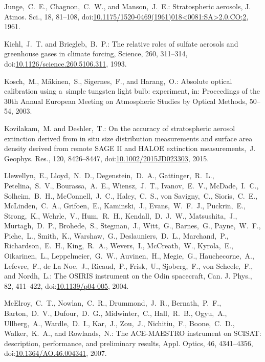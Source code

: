 \documentclass[amtd, online, hvmath]{copernicus}
\begin{document}
\begin{thebibliography}{99}
Junge,~C.~E., Chagnon,~C.~W., and Manson,~J.~E.: Stratospheric aerosols, J.
Atmos. Sci., 18, 81--108,
doi:\href{http://dx.doi.org/10.1175/1520-0469(1961)018<0081:SA>2.0.CO;2}{10.1175/1520-0469(1961)018\textless0081:SA\textgreater2.0.CO;2},
1961.


Kiehl,~J.~T. and Briegleb,~B.~P.: The relative roles of sulfate aerosols and
greenhouse gases in climate forcing, Science, 260, 311--314,
doi:\href{http://dx.doi.org/10.1126/science.260.5106.311}{10.1126/science.260.5106.311},
1993.


Kosch,~M., M\"{a}kinen,~S., Sigernes,~F., and Harang,~O.: Absolute optical
calibration using a~simple tungsten light bulb: experiment, in: Proceedings
of the 30th Annual European Meeting on Atmospheric Studies by Optical
Methods, 50--54, 2003.


Kovilakam,~M. and Deshler,~T.: On the accuracy of stratospheric aerosol
extinction derived from in situ size distribution measurements and surface
area density derived from remote SAGE II and HALOE extinction
measurements,~J. Geophys. Res., 120, 8426--8447,
doi:\href{http://dx.doi.org/10.1002/2015JD023303}{10.1002/2015JD023303},
2015.


Llewellyn,~E., Lloyd,~N.~D., Degenstein,~D.~A., Gattinger,~R.~L.,
Petelina,~S.~V., Bourassa,~A.~E., Wiensz,~J.~T., Ivanov,~E.~V.,
McDade,~I.~C., Solheim,~B.~H., McConnell,~J.~C., Haley,~C.~S., von
Savigny,~C., Sioris,~C.~E., McLinden,~C.~A., Grifoen,~E., Kaminski,~J.,
Evans,~W.~F.~J., Puckrin,~E., Strong,~K., Wehrle,~V., Hum,~R.~H.,
Kendall,~D.~J.~W., Matsushita,~J., Murtagh,~D.~P., Brohede,~S., Stegman,~J.,
Witt,~G., Barnes,~G., Payne,~W.~F., Piche,~L., Smith,~K., Warshaw,~G.,
Deslauniers,~D.~L., Marchand,~P., Richardson,~E.~H., King,~R.~A., Wevers,~I.,
McCreath,~W., Kyrola,~E., Oikarinen,~L., Leppelmeier,~G.~W., Auvinen,~H.,
Megie,~G., Hauchecorne,~A., Lefevre,~F., de La Noe,~J., Ricaud,~P.,
Frisk,~U., Sjoberg,~F., von Scheele,~F., and Nordh,~L.: The OSIRIS instrument
on the Odin spacecraft, Can. J. Phys., 82, 411--422,
doi:\href{http://dx.doi.org/10.1139/p04-005}{10.1139/p04-005}, 2004.


McElroy,~C.~T., Nowlan,~C.~R., Drummond,~J.~R., Bernath,~P.~F.,
Barton,~D.~V., Dufour,~D.~G., Midwinter,~C., Hall,~R.~B., Ogyu,~A.,
Ullberg,~A., Wardle,~D.~I., Kar,~J., Zou,~J., Nichitiu,~F., Boone,~C.~D.,
Walker,~K.~A., and Rowlands,~N.: The ACE-MAESTRO instrument on SCISAT:
description, performance, and preliminary results, Appl. Optics, 46,
4341--4356,
doi:\href{http://dx.doi.org/10.1364/AO.46.004341}{10.1364/AO.46.004341},
2007.



\end{thebibliography}
\end{document}
